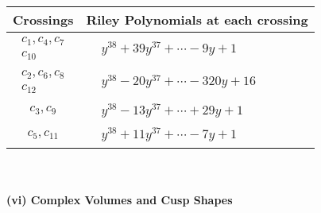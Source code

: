 \documentclass[1p]{elsarticle_modified}
\theoremstyle{definition}
\begin{document}
\begin{tabular}{m{50pt}|m{274pt}}
Crossings & \hspace{64pt}Riley Polynomials at each crossing \\
\hline $$\begin{aligned}c_{1},c_{4},c_{7}\\c_{10}\end{aligned}$$&$\begin{aligned}
&y^{38}+39 y^{37}+\cdots-9 y+1
\end{aligned}$\\
\hline $$\begin{aligned}c_{2},c_{6},c_{8}\\c_{12}\end{aligned}$$&$\begin{aligned}
&y^{38}-20 y^{37}+\cdots-320 y+16
\end{aligned}$\\
\hline $$\begin{aligned}c_{3},c_{9}\end{aligned}$$&$\begin{aligned}
&y^{38}-13 y^{37}+\cdots+29 y+1
\end{aligned}$\\
\hline $$\begin{aligned}c_{5},c_{11}\end{aligned}$$&$\begin{aligned}
&y^{38}+11 y^{37}+\cdots-7 y+1
\end{aligned}$\\
\hline
\end{tabular}\\~\\
\newpage\flushleft \textbf{(vi) Complex Volumes and Cusp Shapes}
\end{document}
